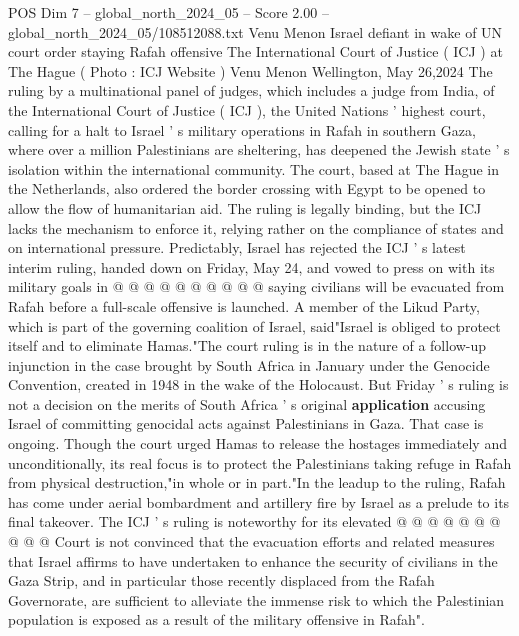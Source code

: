 \begin{textsample}{POS Dim 7 – global\_north\_2024\_05 – Score 2.00 – global\_north\_2024\_05/108512088.txt}  \label{ex:f7_pos_269}
Venu Menon Israel defiant in wake of UN court order staying Rafah offensive The International Court of Justice ( ICJ ) at The Hague ( Photo : ICJ Website ) Venu Menon Wellington, May 26,2024 The ruling by a multinational panel of judges, which includes a judge from India, of the International Court of Justice ( ICJ ), the United Nations ' highest court, calling for a halt to Israel ' s military operations in Rafah in southern Gaza, where over a million Palestinians are sheltering, has deepened the Jewish state ' s isolation within the international community.
The court, based at The Hague in the Netherlands, also ordered the border crossing with Egypt to be opened to allow the flow of humanitarian aid.
The ruling is legally binding, but the ICJ lacks the mechanism to enforce it, relying rather on the compliance of states and on international pressure.
Predictably, Israel has rejected the ICJ ' s latest interim ruling, handed down on Friday, May 24, and vowed to press on with its military goals in @ @ @ @ @ @ @ @ @ @ saying civilians will be evacuated from Rafah before a full-scale offensive is launched.
A member of the Likud Party, which is part of the governing coalition of Israel, said"Israel is obliged to protect itself and to eliminate Hamas."The court ruling is in the nature of a follow-up injunction in the case brought by South Africa in January under the Genocide Convention, created in 1948 in the wake of the Holocaust.
But Friday ' s ruling is not a decision on the merits of South Africa ' s original \textbf{application} accusing Israel of committing genocidal acts against Palestinians in Gaza.
That case is ongoing.
Though the court urged Hamas to release the hostages immediately and unconditionally, its real focus is to protect the Palestinians taking refuge in Rafah from physical destruction,"in whole or in part."In the leadup to the ruling, Rafah has come under aerial bombardment and artillery fire by Israel as a prelude to its final takeover.
The ICJ ' s ruling is noteworthy for its elevated @ @ @ @ @ @ @ @ @ @ Court is not convinced that the evacuation efforts and related measures that Israel affirms to have undertaken to enhance the security of civilians in the Gaza Strip, and in particular those recently displaced from the Rafah Governorate, are sufficient to alleviate the immense risk to which the Palestinian population is exposed as a result of the military offensive in Rafah".

\end{textsample}
